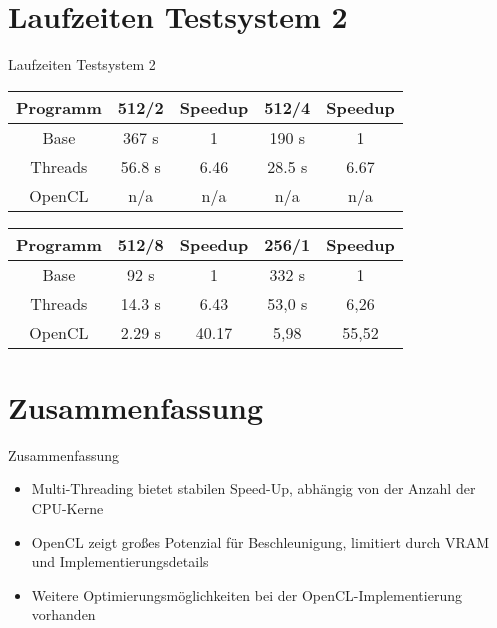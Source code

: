 \documentclass{beamer}
\begin{document}
\section{Laufzeiten Testsystem 2}
\begin{frame}{Laufzeiten Testsystem 2}
    \begin{table}[]
        \centering
        \begin{tabular}{|c|c|c|c|c|}
            \hline
            \textbf{Programm} & \textbf{512/2} & \textbf{Speedup} & \textbf{512/4} & \textbf{Speedup} \\ \hline
            Base & 367 s & 1 & 190 s & 1 \\ \hline
            Threads & 56.8 s & 6.46 & 28.5 s & 6.67 \\ \hline
            OpenCL & n/a & n/a & n/a & n/a \\ \hline
        \end{tabular}
    \end{table}
    \begin{table}[]
        \centering
        \begin{tabular}{|c|c|c|c|c|}
            \hline
            \textbf{Programm} & \textbf{512/8} & \textbf{Speedup} & \textbf{256/1} & \textbf{Speedup} \\ \hline
            Base & 92 s & 1 & 332 s & 1 \\ \hline
            Threads & 14.3 s & 6.43 & 53,0 s & 6,26 \\ \hline
            OpenCL & 2.29 s & 40.17 & 5,98 & 55,52\\ \hline
        \end{tabular}
    \end{table}
\end{frame}

\section{Zusammenfassung}
\begin{frame}{Zusammenfassung}
    \begin{itemize}
        \item Multi-Threading bietet stabilen Speed-Up, abhängig von der Anzahl der CPU-Kerne
        \item OpenCL zeigt großes Potenzial für Beschleunigung, limitiert durch VRAM und Implementierungsdetails
        \item Weitere Optimierungsmöglichkeiten bei der OpenCL-Implementierung vorhanden
    \end{itemize}
\end{frame}
\end{document}
